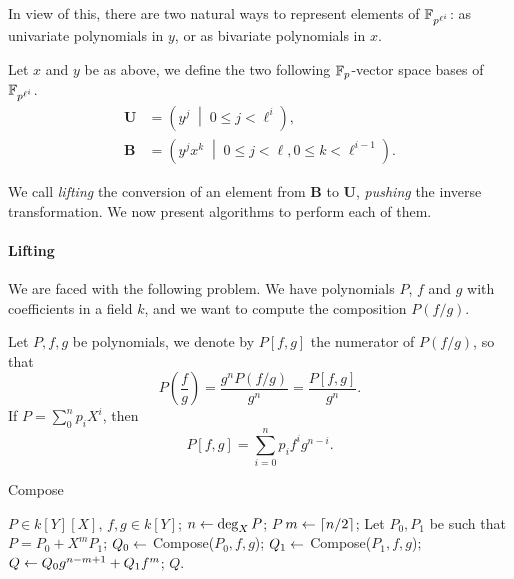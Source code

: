 \documentclass{sig-alternate}
\newcommand{\bb}{\mathbf{B}}
\newcommand{\uu}{\mathbf{U}}  %
\begin{document}
In view of this, there are two natural ways to represent elements of
$\mathbb{F}_{p^{\ell^i}}$: as univariate polynomials in $y$, or as bivariate
polynomials in $x$.

\begin{definition}
  Let $x$ and $y$ be as above, we define the two following
  $\mathbb{F}_p$-vector space bases of $\mathbb{F}_{p^{\ell^i}}$.
  \begin{align}
    \label{eq:uni-basis}
    \uu &= \left(y^j \;\middle|\; 0\le j <\ell^i\right),\\
    \label{eq:bi-basis}
    \bb &= \left(y^jx^k \;\middle|\; 0\le j <\ell, 0\le k <\ell^{i-1}\right).
  \end{align}
\end{definition}

We call \emph{lifting} the conversion of an element from $\bb$ to
$\uu$, \emph{pushing} the inverse transformation. We now present
algorithms to perform each of them.

\paragraph{Lifting}
We are faced with the following problem. We have polynomials $P$, $f$
and $g$ with coefficients in a field $k$, and we want to compute the
composition $P(f/g)$.

\begin{definition}
  Let $P,f,g$ be polynomials, we denote by $P[f,g]$ the numerator of
  $P(f/g)$, so that
  \begin{equation}
    P\left(\frac{f}{g}\right) = \frac{g^nP(f/g)}{g^n} = \frac{P[f,g]}{g^n}.
  \end{equation}
  If $P=\sum_0^np_iX^i$, then
  \begin{equation}
    P[f,g] = \sum_{i=0}^n  p_if^ig^{n-i}.
  \end{equation}
\end{definition}

\begin{algorithm}[t]
  \caption{Compose}
  \label{alg:compose}
  \begin{algorithmic}[1]
    \REQUIRE $P\in k[Y][X]$, $f,g\in k[Y]$;
    \STATE $n \leftarrow \deg_X P$;
    \ENSURE $P$
    \ELSE
    \STATE $m \leftarrow \lceil n/2\rceil$;
    \STATE Let $P_0,P_1$ be such that $P = P_0 + X^mP_1$;
    \STATE $Q_0 \leftarrow$ Compose($P_0, f, g$);
    \STATE $Q_1 \leftarrow$ Compose($P_1, f, g$);
    \STATE \label{alg:compose:res}
    $Q \leftarrow Q_0g^{n-m+1} + Q_1f^m$;
    \ENSURE $Q$.
    \ENDIF
  \end{algorithmic}
\end{algorithm}
\end{document}
